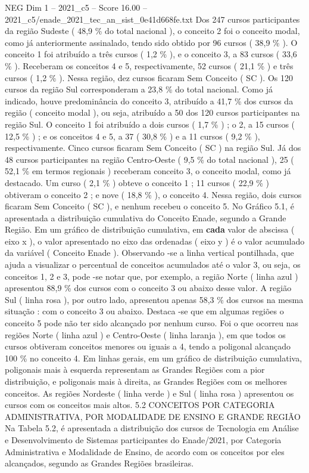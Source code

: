 \begin{textsample}{NEG Dim 1 – 2021\_c5 – Score 16.00 – 2021\_c5/enade\_2021\_tec\_an\_sist\_0e41d668fe.txt}
Dos 247 cursos participantes da região Sudeste ( 48,9 \% do total nacional ), o conceito 2 foi o conceito modal, como já anteriormente assinalado, tendo sido obtido por 96 cursos ( 38,9 \% ).
O conceito 1 foi atribuído a três cursos ( 1,2 \% ), e o conceito 3, a 83 cursos ( 33,6 \% ).
Receberam os conceitos 4 e 5, respectivamente, 52 cursos ( 21,1 \% ) e três cursos ( 1,2 \% ).
Nessa região, dez cursos ficaram Sem Conceito ( SC ).
Os 120 cursos da região Sul corresponderam a 23,8 \% do total nacional.
Como já indicado, houve predominância do conceito 3, atribuído a 41,7 \% dos cursos da região ( conceito modal ), ou seja, atribuído a 50 dos 120 cursos participantes na região Sul.
O conceito 1 foi atribuído a dois cursos ( 1,7 \% ) ; o 2, a 15 cursos ( 12,5 \% ) ; e os conceitos 4 e 5, a 37 ( 30,8 \% ) e a 11 cursos ( 9,2 \% ), respectivamente.
Cinco cursos ficaram Sem Conceito ( SC ) na região Sul.
Já dos 48 cursos participantes na região Centro-Oeste ( 9,5 \% do total nacional ), 25 ( 52,1 \% em termos regionais ) receberam conceito 3, o conceito modal, como já destacado.
Um curso ( 2,1 \% ) obteve o conceito 1 ; 11 cursos ( 22,9 \% ) obtiveram o conceito 2 ; e nove ( 18,8 \% ), o conceito 4.
Nessa região, dois cursos ficaram Sem Conceito ( SC ), e nenhum recebeu o conceito 5.
No Gráfico 5.1, é apresentada a distribuição cumulativa do Conceito Enade, segundo a Grande Região.
Em um gráfico de distribuição cumulativa, em \textbf{cada} valor de abscissa ( eixo x ), o valor apresentado no eixo das ordenadas ( eixo y ) é o valor acumulado da variável ( Conceito Enade ).
Observando -se a linha vertical pontilhada, que ajuda a visualizar o percentual de conceitos acumulados até o valor 3, ou seja, os conceitos 1, 2 e 3, pode -se notar que, por exemplo, a região Norte ( linha azul ) apresentou 88,9 \% dos cursos com o conceito 3 ou abaixo desse valor.
A região Sul ( linha rosa ), por outro lado, apresentou apenas 58,3 \% dos cursos na mesma situação : com o conceito 3 ou abaixo.
Destaca -se que em algumas regiões o conceito 5 pode não ter sido alcançado por nenhum curso.
Foi o que ocorreu nas regiões Norte ( linha azul ) e Centro-Oeste ( linha laranja ), em que todos os cursos obtiveram conceitos menores ou iguais a 4, tendo a poligonal alcançado 100 \% no conceito 4.
Em linhas gerais, em um gráfico de distribuição cumulativa, poligonais mais à esquerda representam as Grandes Regiões com a pior distribuição, e poligonais mais à direita, as Grandes Regiões com os melhores conceitos.
As regiões Nordeste ( linha verde ) e Sul ( linha rosa ) apresentou os cursos com os conceitos mais altos. 5.2 CONCEITOS POR CATEGORIA ADMINISTRATIVA, POR MODALIDADE DE ENSINO E GRANDE REGIÃO Na Tabela 5.2, é apresentada a distribuição dos cursos de Tecnologia em Análise e Desenvolvimento de Sistemas participantes do Enade/2021, por Categoria Administrativa e Modalidade de Ensino, de acordo com os conceitos por eles alcançados, segundo as Grandes Regiões brasileiras.

\end{textsample}
